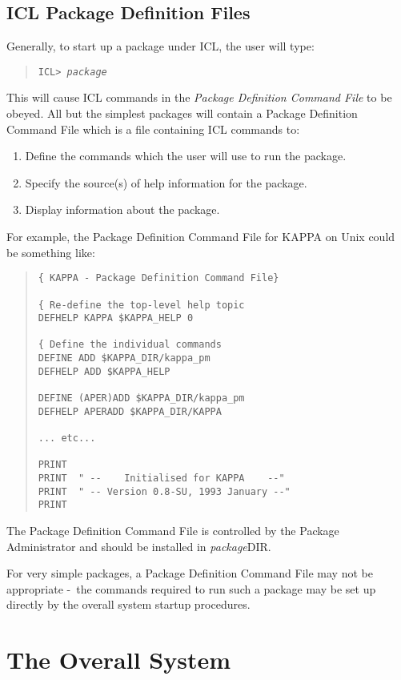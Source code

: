 \documentclass[twoside,11pt]{article}
\newcommand{\xref}[3]{#1}
\newcommand{\xlabel}[1]{}
\renewcommand{\_}{\texttt{\symbol{95}}}
\newcommand{\dash}{--}
\renewcommand{\dash}{-}
\begin{document}
\subsection{\xlabel{icl_package_definition_files}ICL Package Definition Files}
Generally, to start up a package under 
\xref{ICL}{sg5}{}, the user will type:
\begin{quote}
\texttt{ICL> \textit{package}}
\end{quote}
This will cause ICL commands in the \textit{Package Definition Command File} to be
obeyed. All but the simplest packages will contain a Package Definition 
Command File which is a file containing ICL commands to:
\begin{enumerate}
\item Define the commands which the user will use to run the package.
\item Specify the source(s) of help information for the package.
\item Display information about the package.
\end{enumerate}
For example, the Package Definition Command File for KAPPA on Unix
could be something like:
\begin{quote}
\begin{verbatim}
{ KAPPA - Package Definition Command File}

{ Re-define the top-level help topic
DEFHELP KAPPA $KAPPA_HELP 0

{ Define the individual commands
DEFINE ADD $KAPPA_DIR/kappa_pm
DEFHELP ADD $KAPPA_HELP

DEFINE (APER)ADD $KAPPA_DIR/kappa_pm
DEFHELP APERADD $KAPPA_DIR/KAPPA

... etc...

PRINT
PRINT  " --    Initialised for KAPPA    --"
PRINT  " -- Version 0.8-SU, 1993 January --"
PRINT
\end{verbatim}
\end{quote}

The Package Definition Command File is controlled by the Package Administrator
and should be installed in \textit{package}\_DIR.

For very simple packages, a Package Definition Command File may not be
appropriate \dash\ the commands required to run such a package may be set up
directly by the overall system startup procedures.

\section{\xlabel{the_overall_system}The Overall System}
\end{document}
